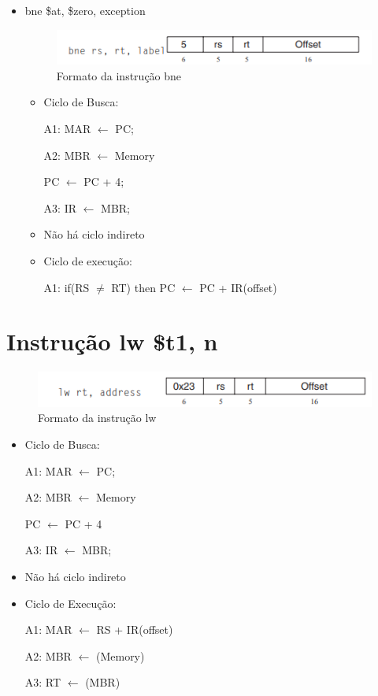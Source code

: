 \documentclass[
	12pt,				%
	oneside,			%
	a4paper,			%
	english,			%
	brazil				%
	]{abntex2ppgsi}
\begin{document}
\begin{itemize}
    \item bne \$at, \$zero, exception
    \begin{figure}[h]
        \centering
        \includegraphics{413.png}
        \caption{Formato da instrução bne}
        \label{fig413}
    \end{figure}
    \begin{itemize}
        \item Ciclo de Busca: 

        A1: MAR $\leftarrow$ PC;

        A2: MBR $\leftarrow$ Memory

        PC $\leftarrow$ PC + 4;

        A3: IR $\leftarrow$ MBR;

        \item Não há ciclo indireto
        \item Ciclo de execução:

        A1: if(RS $\neq$ RT) then PC $\leftarrow$ PC + IR(offset)
    \end{itemize}
\end{itemize}

\section{Instrução lw \$t1, n}
\begin{figure}[h]
    \centering
    \includegraphics{42.png}
    \caption{Formato da instrução lw}
    \label{fig42}
\end{figure}

\begin{itemize}
    \item Ciclo de Busca:

    A1: MAR $\leftarrow$ PC;

    A2: MBR $\leftarrow$ Memory

    PC $\leftarrow$ PC + 4

    A3: IR $\leftarrow$ MBR;

    \item Não há ciclo indireto
    \item Ciclo de Execução:

    A1: MAR $\leftarrow$ RS + IR(offset)

    A2: MBR $\leftarrow$ (Memory)

    A3: RT $\leftarrow$ (MBR)
\end{itemize}
\end{document}
